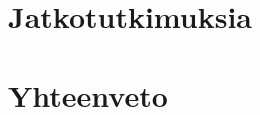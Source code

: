 \documentclass{tktltiki}
\begin{document}
%   
%   
  
  
\section{Jatkotutkimuksia}
\section{Yhteenveto}





\lastpage
\end{document}

